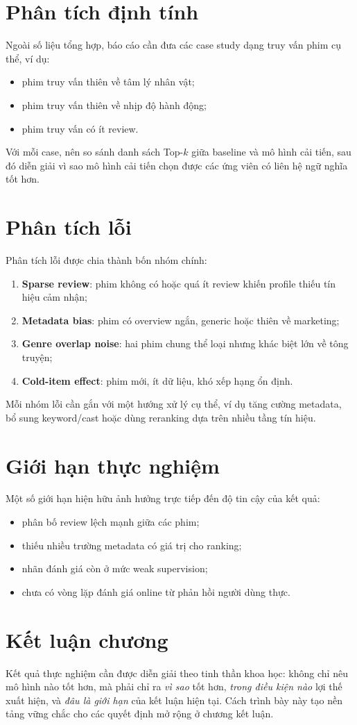 \section{Phân tích định tính}
Ngoài số liệu tổng hợp, báo cáo cần đưa các case study dạng truy vấn phim cụ thể, ví dụ:
\begin{itemize}
    \item phim truy vấn thiên về tâm lý nhân vật;
    \item phim truy vấn thiên về nhịp độ hành động;
    \item phim truy vấn có ít review.
\end{itemize}

Với mỗi case, nên so sánh danh sách Top-$k$ giữa baseline và mô hình cải tiến, sau đó diễn giải vì sao mô hình cải tiến chọn được các ứng viên có liên hệ ngữ nghĩa tốt hơn.

\section{Phân tích lỗi}
Phân tích lỗi được chia thành bốn nhóm chính:
\begin{enumerate}[label=\arabic*.]
    \item \textbf{Sparse review}: phim không có hoặc quá ít review khiến profile thiếu tín hiệu cảm nhận;
    \item \textbf{Metadata bias}: phim có overview ngắn, generic hoặc thiên về marketing;
    \item \textbf{Genre overlap noise}: hai phim chung thể loại nhưng khác biệt lớn về tông truyện;
    \item \textbf{Cold-item effect}: phim mới, ít dữ liệu, khó xếp hạng ổn định.
\end{enumerate}

Mỗi nhóm lỗi cần gắn với một hướng xử lý cụ thể, ví dụ tăng cường metadata, bổ sung keyword/cast hoặc dùng reranking dựa trên nhiều tầng tín hiệu.

\section{Giới hạn thực nghiệm}
Một số giới hạn hiện hữu ảnh hưởng trực tiếp đến độ tin cậy của kết quả:
\begin{itemize}
    \item phân bố review lệch mạnh giữa các phim;
    \item thiếu nhiều trường metadata có giá trị cho ranking;
    \item nhãn đánh giá còn ở mức weak supervision;
    \item chưa có vòng lặp đánh giá online từ phản hồi người dùng thực.
\end{itemize}

\section{Kết luận chương}
Kết quả thực nghiệm cần được diễn giải theo tinh thần khoa học: không chỉ nêu mô hình nào tốt hơn, mà phải chỉ ra \textit{vì sao} tốt hơn, \textit{trong điều kiện nào} lợi thế xuất hiện, và \textit{đâu là giới hạn} của kết luận hiện tại. Cách trình bày này tạo nền tảng vững chắc cho các quyết định mở rộng ở chương kết luận.
